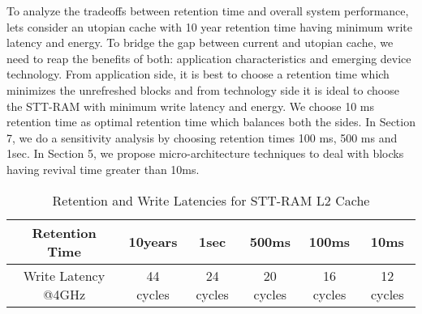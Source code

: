 To analyze the tradeoffs between retention time and overall system performance, lets consider an utopian cache with 10 year retention time having minimum write latency and energy.  To bridge the gap between current and utopian cache, we need to reap the benefits of both: application characteristics and emerging device technology. From application side, it is best to choose a retention time which minimizes the unrefreshed blocks and from technology side it is ideal to choose the STT-RAM with minimum write latency and energy. We choose 10 ms retention time as optimal retention time which balances both the sides. In Section 7, we do a sensitivity analysis by choosing retention times 100 ms, 500 ms and 1sec. In Section 5, we propose micro-architecture techniques to deal with blocks having revival time greater than 10ms. 

\begin{table*}[t]
  \centering
  \caption{Retention and Write Latencies for STT-RAM L2 Cache}
  \label{table:rt-wt}
  \begin{tabular}{| c | c | c | c | c | c |}
  	\hline
	 Retention Time & 10years & 1sec & 500ms & 100ms & 10ms \\
	\hline
	Write Latency @4GHz & 44 cycles & 24 cycles & 20 cycles & 16 cycles & 12 cycles \\
	\hline
  \end{tabular}
\end{table*}



 
  


